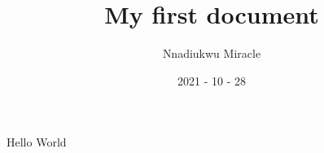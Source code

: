 \documentclass{article}
\title{My first document}
\date{2021 - 10 - 28}
\author{Nnadiukwu Miracle}
\begin{document}
	\maketitle
	\newpage
	Hello World
	
\end{document}
